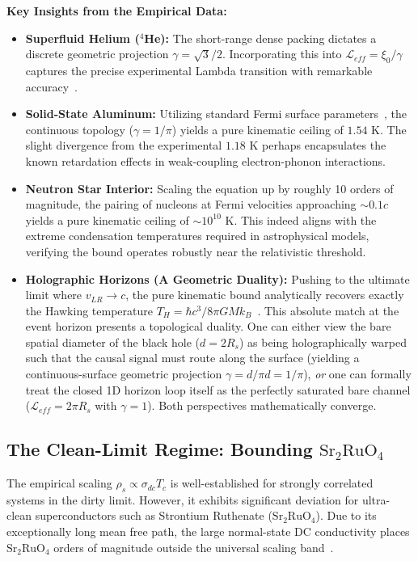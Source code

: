 \documentclass[11pt,a4paper]{article}
\begin{document}
\vspace{0.4cm}
\noindent \textbf{Key Insights from the Empirical Data:}
\begin{itemize}
    \item \textbf{Superfluid Helium ($^4$He):} The short-range dense packing dictates a discrete geometric projection $\gamma = \sqrt{3}/2$. Incorporating this into $\mathcal{L}_{eff} = \xi_0 / \gamma$ captures the precise experimental Lambda transition with remarkable accuracy~\cite{Donnelly1998}.
    \item \textbf{Solid-State Aluminum:} Utilizing standard Fermi surface parameters~\cite{Ashcroft1976}, the continuous topology ($\gamma=1/\pi$) yields a pure kinematic ceiling of $1.54$ K. The slight divergence from the experimental $1.18$ K perhaps encapsulates the known retardation effects in weak-coupling electron-phonon interactions.
    \item \textbf{Neutron Star Interior:} Scaling the equation up by roughly 10 orders of magnitude, the pairing of nucleons at Fermi velocities approaching $\sim 0.1c$ yields a pure kinematic ceiling of $\sim 10^{10}$ K. This indeed aligns with the extreme condensation temperatures required in astrophysical models, verifying the bound operates robustly near the relativistic threshold.
    \item \textbf{Holographic Horizons (A Geometric Duality):} Pushing to the ultimate limit where $v_{LR} \to c$, the pure kinematic bound analytically recovers exactly the Hawking temperature $T_H = \hbar c^3 / 8\pi G M k_B$~\cite{Hawking1975}. This absolute match at the event horizon presents a topological duality. One can either view the bare spatial diameter of the black hole ($d = 2R_s$) as being holographically warped such that the causal signal must route along the surface (yielding a continuous-surface geometric projection $\gamma = d / \pi d = 1/\pi$), \textit{or} one can formally treat the closed 1D horizon loop itself as the perfectly saturated bare channel ($\mathcal{L}_{eff} = 2\pi R_s$ with $\gamma = 1$). Both perspectives mathematically converge.
\end{itemize}

\subsection*{The Clean-Limit Regime: Bounding $\text{Sr}_2\text{RuO}_4$}
The empirical scaling $\rho_s \propto \sigma_{dc} T_c$ is well-established for strongly correlated systems in the dirty limit. However, it exhibits significant deviation for ultra-clean superconductors such as Strontium Ruthenate ($\text{Sr}_2\text{RuO}_4$). Due to its exceptionally long mean free path, the large normal-state DC conductivity places $\text{Sr}_2\text{RuO}_4$ orders of magnitude outside the universal scaling band~\cite{Homes2004}.
\end{document}
